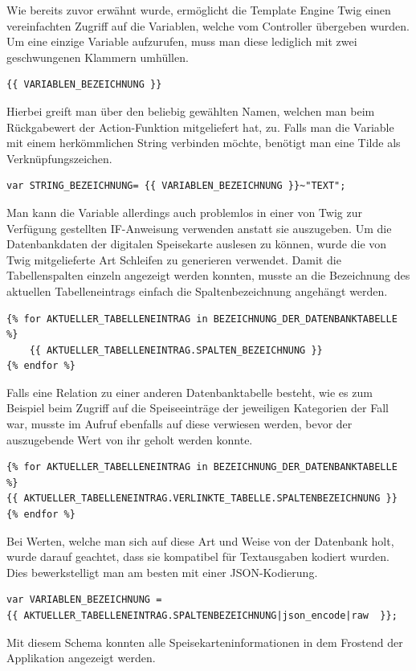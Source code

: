 Wie bereits zuvor erwähnt wurde, ermöglicht die Template Engine Twig einen vereinfachten Zugriff auf die Variablen, welche vom Controller übergeben wurden. Um eine einzige Variable aufzurufen, muss man diese lediglich mit zwei geschwungenen Klammern umhüllen. 
\lstset{language = php}
  	\begin{lstlisting}
{{ VARIABLEN_BEZEICHNUNG }}
\end{lstlisting}
Hierbei greift man über den beliebig gewählten Namen, welchen man beim Rückgabewert der Action-Funktion mitgeliefert hat, zu. 
Falls man die Variable mit einem herkömmlichen String verbinden möchte, benötigt man eine Tilde als Verknüpfungszeichen. 
\lstset{language = php}
  	\begin{lstlisting}
var STRING_BEZEICHNUNG= {{ VARIABLEN_BEZEICHNUNG }}~"TEXT";
	\end{lstlisting}
Man kann die Variable allerdings auch problemlos in einer von Twig zur Verfügung gestellten IF-Anweisung verwenden anstatt sie auszugeben.
Um die Datenbankdaten der digitalen Speisekarte auslesen zu können, wurde die von Twig mitgelieferte Art Schleifen zu generieren verwendet. Damit die Tabellenspalten einzeln angezeigt werden konnten, musste an die Bezeichnung des aktuellen Tabelleneintrags einfach die Spaltenbezeichnung angehängt werden. 
\lstset{language = php}
  	\begin{lstlisting}
{% for AKTUELLER_TABELLENEINTRAG in BEZEICHNUNG_DER_DATENBANKTABELLE %}
	{{ AKTUELLER_TABELLENEINTRAG.SPALTEN_BEZEICHNUNG }}
{% endfor %}
	\end{lstlisting}
Falls eine Relation zu einer anderen Datenbanktabelle besteht, wie es zum Beispiel beim Zugriff auf die Speiseeinträge der jeweiligen Kategorien der Fall war, musste im Aufruf ebenfalls auf diese verwiesen werden, bevor der auszugebende Wert von ihr geholt werden konnte.
\lstset{language = php}
  	\begin{lstlisting}
{% for AKTUELLER_TABELLENEINTRAG in BEZEICHNUNG_DER_DATENBANKTABELLE %}
{{ AKTUELLER_TABELLENEINTRAG.VERLINKTE_TABELLE.SPALTENBEZEICHNUNG }}
{% endfor %}
	\end{lstlisting}
Bei Werten, welche man sich auf diese Art und Weise von der Datenbank holt, wurde darauf geachtet, dass sie kompatibel für Textausgaben kodiert wurden. Dies bewerkstelligt man am besten mit einer JSON-Kodierung.
\lstset{language = php}
  	\begin{lstlisting}
var VARIABLEN_BEZEICHNUNG = 
{{ AKTUELLER_TABELLENEINTRAG.SPALTENBEZEICHNUNG|json_encode|raw  }};
	\end{lstlisting}
Mit diesem Schema konnten alle Speisekarteninformationen in dem Frostend der Applikation angezeigt werden.

